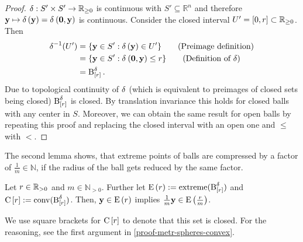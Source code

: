 \begin{proof}
  $\metric : S' \times S' \to \mathbb{R}_{\geq 0}$ is continuous with $S' \subseteq \mathbb{R}^n$ and therefore $\ve{y} \mapsto \metro{\ve{y}} = \metr{\ve{0}}{\ve{y}}$ is continuous.
	Consider the closed interval $U' = [0, \dis] \subset \mathbb{R}_{\geq 0}$. Then
	\begin{align*}
    \metric^{-1}(U') & = \{\ve{y} \in S' : \metro{\ve{y}} \in U'\}     \tag{Preimage definition}   \\
                     & = \{\ve{y} \in S' : \metr{\ve{0}}{\ve{y}} \leq \dis\} \tag{Definition of $\metric$} \\
                     & = \cball{\dis}.
	\end{align*}
	Due to topological continuity of $\metric$ (which is equivalent to preimages of closed sets being closed) $\cball{\dis}$ is closed. By translation invariance this holds for closed balls with any center in $S$.
	Moreover, we can obtain the same result for open balls by repeating this proof and replacing the closed interval with an open one and $\leq$ with $<$.
\end{proof}

The second lemma shows, that extreme points of balls are compressed by a factor of $\frac{1}{m} \in \mathbb{N}$, if the radius of the ball gets reduced by the same factor.

\begin{lem} \label{lem-compr-extr-points}
	Let $\dis \in \mathbb{R}_{> 0}$ and $m \in \mathbb{N}_{>0}$. Further let $\E := \extr ( \cball{\dis})$ and $\CO := \co(\cball{\dis})$.
  Then, $\ve{y} \in \E[\dis]$ implies $\frac{1}{m}\ve{y} \in \E[\frac{\dis}{m}]$.
\end{lem}

\begin{rem*}
  We use square brackets for $\CO$ to denote that this set is closed. For the reasoning, see the first argument in \cref{proof-metr-spheres-convex}.
\end{rem*}

